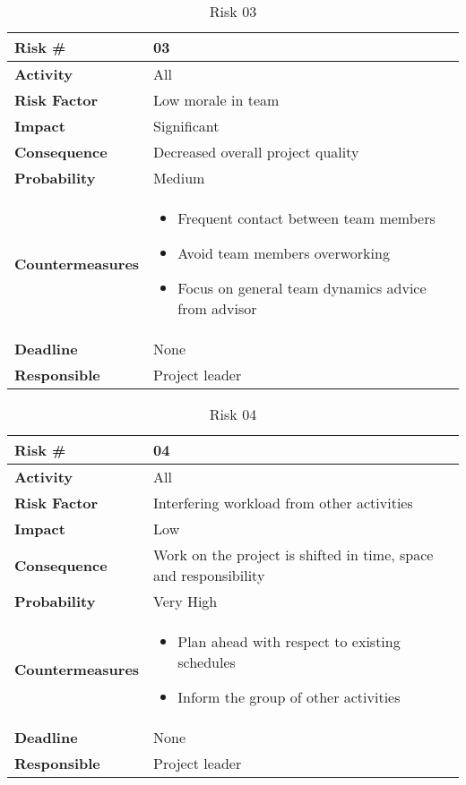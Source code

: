 \medskip

\begin{table}
\begin{tabularx}{\textwidth}{ | l | X | }
\hline
\textbf{Risk \#} & 03 \\ \hline
\textbf{Activity} & All \\ \hline
\textbf{Risk Factor} & Low morale in team \\ \hline
\textbf{Impact} & Significant \\ \hline
\textbf{Consequence} & Decreased overall project quality \\ \hline
\textbf{Probability} & Medium  \\ \hline
\textbf{Countermeasures} & \begin{itemize}
  \item Frequent contact between team members
  \item Avoid team members overworking
  \item Focus on general team dynamics advice from advisor
\end{itemize}  \\ \hline
\textbf{Deadline} &  None \\ \hline
\textbf{Responsible} & Project leader \\ \hline
\end{tabularx}
\caption{Risk 03}
\end{table}

\medskip

\begin{table}
\begin{tabularx}{\textwidth}{ | l | X | }
\hline
\textbf{Risk \#} & 04 \\ \hline
\textbf{Activity} & All \\ \hline
\textbf{Risk Factor} & Interfering workload from other activities \\ \hline
\textbf{Impact} & Low \\ \hline
\textbf{Consequence} & Work on the project is shifted in time, space and responsibility \\ \hline
\textbf{Probability} & Very High \\ \hline
\textbf{Countermeasures} & \begin{itemize}
  \item Plan ahead with respect to existing schedules
  \item Inform the group of other activities
\end{itemize}  \\ \hline
\textbf{Deadline} &  None \\ \hline
\textbf{Responsible} & Project leader \\ \hline
\end{tabularx}
\caption{Risk 04}
\end{table}


